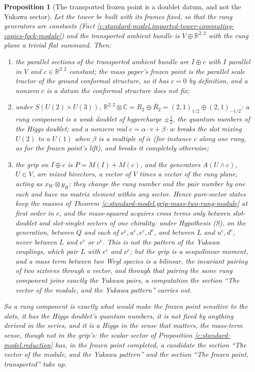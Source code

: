 \documentclass[11pt]{article}
\newtheorem{proposition}[theorem]{Proposition}
\theoremstyle{definition}
\theoremstyle{plain}
\newcommand{\changedmark}[2]{\marginpar{\raggedright\scriptsize\color{#1}#2}}
\providecommand{\C}{}\renewcommand{\C}{\mathbb{C}}
\providecommand{\R}{}\renewcommand{\R}{\mathbb{R}}
\begin{document}
\begin{proposition}[The transported frozen point is a doublet datum, and not the Yukawa sector]\label{c:standard-model.transported-frozen-point-doublet-datum-not}
\changedmark{BurntOrange}{changed since the deposit}
Let the tower be built with its frames fixed, so that the rung generators are constants (Fact \ref{c:standard-model.imported-tower-commuting-copies-fock-module}) and the transported ambient bundle is $V \oplus \R^{2,2}$ with the rung plane a trivial flat summand. Then:
\begin{enumerate}
\item[(i)] the parallel sections of the transported ambient bundle are $I \oplus c$ with $I$ parallel in $V$ and $c \in \R^{2,2}$ constant; the mass paper's frozen point is the parallel scale tractor of the ground conformal structure, so it has $c = 0$ by definition, and a nonzero $c$ is a datum the conformal structure does not fix;
\item[(ii)] under $S(U(2) \times U(3))$, $\R^{2,2} \otimes \C = R_{2} \oplus \overline{R}_{2} = (2,1)_{1/2} \oplus (2,1)_{-1/2}$: a rung component is a weak doublet of hypercharge $\pm\tfrac12$, the quantum numbers of the Higgs doublet; and a nonzero real $c = \alpha\cdot v + \beta\cdot w$ breaks the slot mixing $U(2)$ to a $U(1)$ when $\beta$ is a multiple of $\bar\alpha$ (for instance $c$ along one rung, as for the frozen point's lift), and breaks it completely otherwise;
\item[(iii)] the grip on $I \oplus c$ is $P = M(I) + M(c)$, and the generators $A(U \wedge c)$, $U \in V$, are mixed bivectors, a vector of $V$ times a vector of the rung plane, acting as $x_{W} \otimes y_{R}$: they change the rung number and the pair number by one each and have no matrix element within any sector. Hence pure-sector states keep the masses of Theorem \ref{c:standard-model.grip-mass-two-rung-module} at first order in $c$, and the mass-squared acquires cross terms only between slot-doublet and slot-singlet sectors of one chirality: under Hypothesis (S), on the generation, between $Q$ and each of $\nu^{c}, u^{c}, e^{c}, d^{c}$, and between $L$ and $u^{c}, d^{c}$, never between $L$ and $e^{c}$ or $\nu^{c}$. This is not the pattern of the Yukawa couplings, which pair $L$ with $e^{c}$ and $\nu^{c}$; but the grip is a sesquilinear moment, and a mass term between two Weyl species is a bilinear, the invariant pairing of two sixteens through a vector, and through that pairing the same rung component joins exactly the Yukawa pairs, a computation the section ``The vector of the module, and the Yukawa pattern'' carries out.
\end{enumerate}
So a rung component is exactly what would make the frozen point sensitive to the slots, it has the Higgs doublet's quantum numbers, it is not fixed by anything derived in the series, and it is a Higgs in the sense that matters, the mass-term sense, though not in the grip's: the scalar sector of Proposition \ref{c:standard-model.reduction} has, in the frozen point completed, a candidate the section ``The vector of the module, and the Yukawa pattern'' and the section ``The frozen point, transported'' take up.
\end{proposition}
\end{document}
